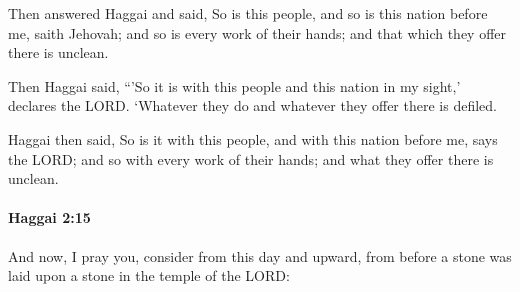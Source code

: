 			\begin{versebox}
					\item[BHS] 
					\item[LXX] 
					\item[ASV] Then answered Haggai and said, So is this people, and so is this nation before me, saith Jehovah; and so is every work of their hands; and that which they offer there is unclean.
					\item[NIV] Then Haggai said, “’So it is with this people and this nation in my sight,’ declares the LORD. ‘Whatever they do and whatever they offer there is defiled.
					\item[NRSV] Haggai then said, So is it with this people, and with this nation before me, says the LORD; and so with every work of their hands; and what they offer there is unclean.
			\end{versebox}

		\paragraph{Haggai 2:15} %
			\label{HAGGAI-2-15}

			And now, I pray you, consider from this day and upward, from before a stone was laid upon a stone in the temple of the LORD:

